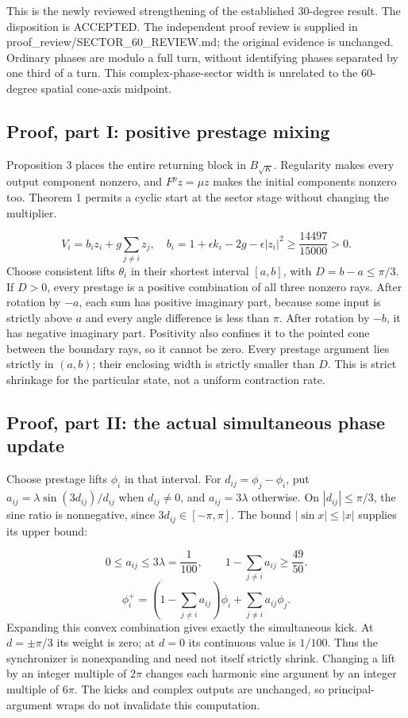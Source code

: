 \documentclass[11pt,a4paper]{article}
\begin{document}
This is the newly reviewed strengthening of the established 30-degree result. The disposition is ACCEPTED. The independent proof review is supplied in proof\_review/SECTOR\_60\_REVIEW.md; the original evidence is unchanged. Ordinary phases are modulo a full turn, without identifying phases separated by one third of a turn. This complex-phase-sector width is unrelated to the 60-degree spatial cone-axis midpoint. \cite{D03} \cite{REV03}

\subsection*{Proof, part I: positive prestage mixing}
Proposition 3 places the entire returning block in $B_{\sqrt{K}}$. Regularity makes every output component nonzero, and $F^p z=\mu z$ makes the initial components nonzero too. Theorem 1 permits a cyclic start at the sector stage without changing the multiplier.

\begin{equation}V_i=b_i z_i+g\sum_{j\neq i}z_j,\quad b_i=1+\epsilon k_i-2g-\epsilon|z_i|^2\geq\frac{14497}{15000}>0.\end{equation}
Choose consistent lifts $\theta_i$ in their shortest interval $[a,b]$, with $D=b-a\leq\pi/3$. If $D>0$, every prestage is a positive combination of all three nonzero rays. After rotation by $-a$, each sum has positive imaginary part, because some input is strictly above $a$ and every angle difference is less than $\pi$. After rotation by $-b$, it has negative imaginary part. Positivity also confines it to the pointed cone between the boundary rays, so it cannot be zero. Every prestage argument lies strictly in $(a,b)$; their enclosing width is strictly smaller than $D$. This is strict shrinkage for the particular state, not a uniform contraction rate.

\subsection*{Proof, part II: the actual simultaneous phase update}
Choose prestage lifts $\phi_i$ in that interval. For $d_{ij}=\phi_j-\phi_i$, put $a_{ij}=\lambda\sin(3d_{ij})/d_{ij}$ when $d_{ij}\neq0$, and $a_{ij}=3\lambda$ otherwise. On $|d_{ij}|\leq\pi/3$, the sine ratio is nonnegative, since $3d_{ij}\in[-\pi,\pi]$. The bound $|\sin x|\leq|x|$ supplies its upper bound:

\begin{equation}0\leq a_{ij}\leq3\lambda=\frac{1}{100},\qquad1-\sum_{j\neq i}a_{ij}\geq\frac{49}{50}.\end{equation}
\begin{equation}\phi_i^+=\left(1-\sum_{j\neq i}a_{ij}\right)\phi_i+\sum_{j\neq i}a_{ij}\phi_j.\end{equation}
Expanding this convex combination gives exactly the simultaneous kick. At $d=\pm\pi/3$ its weight is zero; at $d=0$ its continuous value is $1/100$. Thus the synchronizer is nonexpanding and need not itself strictly shrink. Changing a lift by an integer multiple of $2\pi$ changes each harmonic sine argument by an integer multiple of $6\pi$. The kicks and complex outputs are unchanged, so principal-argument wraps do not invalidate this computation.
\end{document}
